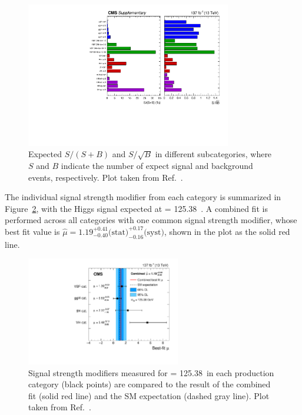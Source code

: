 \begin{figure}[!htb]
    \centering
    \captionsetup{justification=justified}
    \includegraphics[width=0.80\textwidth]{pics/results/purity_signif.pdf}
    \caption{Expected $S/(S+B)$ and $S/\sqrt{B}$ in different subcategories, 
             where $S$ and $B$ indicate the number of expect signal and background events, respectively.
             Plot taken from Ref.~\cite{Sirunyan_2021}.}
    \label{fig:sum_cats_SB}
\end{figure}

The individual signal strength modifier from each category is summarized in Figure~\ref{fig:sum_sig_strength},
with the Higgs signal expected at \mh = 125.38~\GeV.
A combined fit is performed across all categories with one common signal strength modifier, 
whose best fit value is $\hat{\mu} = 1.19^{+0.41}_{-0.40} \text{(stat)}^{+0.17}_{-0.16} \text{(syst)}$, 
shown in the plot as the solid red line.

\begin{figure}[!htb]
    \centering
    \captionsetup{justification=justified}
    \includegraphics[width=0.60\textwidth]{pics/results/sig_strength.pdf}
    \caption{Signal strength modifiers measured for \mh = 125.38~\GeV in each production category (black points) 
             are compared to the result of the combined fit (solid red line) and the SM expectation (dashed gray line).
             Plot taken from Ref.~\cite{Sirunyan_2021}. }
    \label{fig:sum_sig_strength}
\end{figure}

